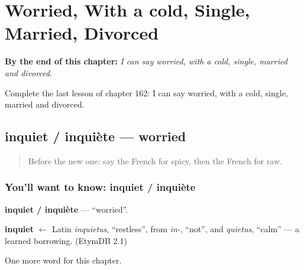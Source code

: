 
\chapter{Worried, With a cold, Single, Married, Divorced}
\label{ch:fr-worried-with-a-cold-single-married-divorced}

\begin{chapteropening}
\textbf{By the end of this chapter:} \emph{I can say worried, with a cold, single, married and divorced.}

Complete the last lesson of chapter 162: I can say worried, with a cold, single, married and divorced.
\end{chapteropening}

\section[inquiet / inquiète]{inquiet / inquiète — worried}

\label{lesson:FR-C162-inquiet-inquiete}



\begin{quote}
Before the new one: say the French for spicy, then the French for raw.
\end{quote}

\subsection*{You'll want to know: inquiet / inquiète}
\textbf{inquiet / inquiète} — \textquotedblleft{}worried\textquotedblright{}.

\begin{cousinweb}
\textbf{inquiet} $\leftarrow$ Latin \emph{inquietus}, \textquotedblleft{}restless\textquotedblright{}, from \emph{in-}, \textquotedblleft{}not\textquotedblright{}, and \emph{quietus}, \textquotedblleft{}calm\textquotedblright{} — a learned borrowing. (EtymDB 2.1)
\end{cousinweb}

\begin{grammarlens}[title={What you've built}]
One more word for this chapter.
\end{grammarlens}

